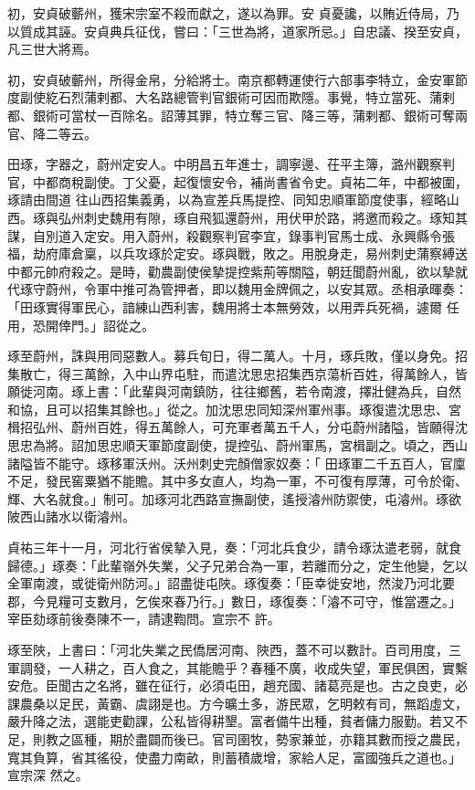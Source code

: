 \begin{pinyinscope}
 初，安貞破蘄州，獲宋宗室不殺而獻之，遂以為罪。安
 貞憂讒，以賄近侍局，乃以質成其誣。安貞典兵征伐，嘗曰：「三世為將，道家所忌。」自忠議、揆至安貞，凡三世大將焉。



 初，安貞破蘄州，所得金帛，分給將士。南京都轉運使行六部事李特立，金安軍節度副使紇石烈蒲剌都、大名路總管判官銀術可因而欺隱。事覺，特立當死、蒲剌都、銀術可當杖一百除名。詔薄其罪，特立奪三官、降三等，蒲剌都、銀術可奪兩官、降二等云。



 田琢，字器之，蔚州定安人。中明昌五年進士，調寧邊、茌平主簿，潞州觀察判官，中都商稅副使。丁父憂，起復懷安令，補尚書省令史。貞祐二年，中都被圍，琢請由間道
 往山西招集義勇，以為宣差兵馬提控、同知忠順軍節度使事，經略山西。琢與弘州刺史魏用有隙，琢自飛狐還蔚州，用伏甲於路，將邀而殺之。琢知其謀，自別道入定安。用入蔚州，殺觀察判官李宜，錄事判官馬士成、永興縣令張福，劫府庫倉稟，以兵攻琢於定安。琢與戰，敗之。用脫身走，易州刺史蒲察縛送中都元帥府殺之。是時，勸農副使侯摯提控紫荊等關隘，朝廷聞蔚州亂，欲以摯就代琢守蔚州，令軍中推可為管押者，即以魏用金牌佩之，以安其眾。丞相承暉奏：「田琢實得軍民心，諳練山西利害，魏用將士本無勞效，以用弄兵死禍，遽爾
 任用，恐開倖門。」詔從之。



 琢至蔚州，誅與用同惡數人。募兵旬日，得二萬人。十月，琢兵敗，僅以身免。招集散亡，得三萬餘，入中山界屯駐，而遣沈思忠招集西京蕩析百姓，得萬餘人，皆願徙河南。琢上書：「此輩與河南鎮防，往往鄉舊，若令南渡，擇壯健為兵，自然和協，且可以招集其餘也。」從之。加沈思忠同知深州軍州事。琢復遣沈思忠、宮楫招弘州、蔚州百姓，得五萬餘人，可充軍者萬五千人，分屯蔚州諸隘，皆願得沈思忠為將。詔加思忠順天軍節度副使，提控弘、蔚州軍馬，宮楫副之。頃之，西山諸隘皆不能守。琢移軍沃州。沃州刺史完顏僧家奴奏：「
 田琢軍二千五百人，官廩不足，發民窖粟猶不能贍。其中多女直人，均為一軍，不可復有厚薄，可令於衛、輝、大名就食。」制可。加琢河北西路宣撫副使，遙授濬州防禦使，屯濬州。琢欲陂西山諸水以衛濬州。



 貞祐三年十一月，河北行省侯摯入見，奏：「河北兵食少，請令琢汰遣老弱，就食歸德。」琢奏：「此輩嶺外失業，父子兄弟合為一軍，若離而分之，定生他變，乞以全軍南渡，或徙衛州防河。」詔盡徙屯陜。琢復奏：「臣幸徙安地，然浚乃河北要郡，今見糧可支數月，乞俟來春乃行。」數日，琢復奏：「濬不可守，惟當遷之。」宰臣劾琢前後奏陳不一，請逮鞫問。宣宗不
 許。



 琢至陜，上書曰：「河北失業之民僑居河南、陜西，蓋不可以數計。百司用度，三軍調發，一人耕之，百人食之，其能贍乎？春種不廣，收成失望，軍民俱困，實繫安危。臣聞古之名將，雖在征行，必須屯田，趙充國、諸葛亮是也。古之良吏，必課農桑以足民，黃霸、虞詡是也。方今曠土多，游民眾，乞明敕有司，無蹈虛文，嚴升降之法，選能吏勸課，公私皆得耕墾。富者備牛出種，貧者傭力服勤。若又不足，則教之區種，期於盡闢而後已。官司圉牧，勢家兼並，亦籍其數而授之農民，寬其負算，省其徭役，使盡力南畝，則蓄積歲增，家給人足，富國強兵之道也。」宣宗深
 然之。




\end{pinyinscope}
